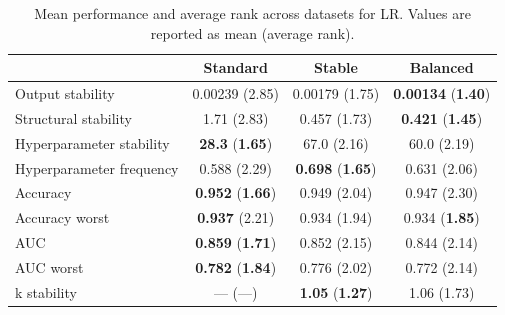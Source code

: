 \begin{table}
\caption{Mean performance and average rank across datasets for LR. Values are reported as mean (average rank).}
\label{tab:lr_mean_performance_rank}
\begin{tabular}{lccc}
\toprule
 & Standard & Stable & Balanced \\
\midrule
Output stability & 0.00239 (2.85) & 0.00179 (1.75) & \textbf{0.00134} (\textbf{1.40}) \\
Structural stability & 1.71 (2.83) & 0.457 (1.73) & \textbf{0.421} (\textbf{1.45}) \\
Hyperparameter stability & \textbf{28.3} (\textbf{1.65}) & 67.0 (2.16) & 60.0 (2.19) \\
Hyperparameter frequency & 0.588 (2.29) & \textbf{0.698} (\textbf{1.65}) & 0.631 (2.06) \\
Accuracy & \textbf{0.952} (\textbf{1.66}) & 0.949 (2.04) & 0.947 (2.30) \\
Accuracy worst & \textbf{0.937} (2.21) & 0.934 (1.94) & 0.934 (\textbf{1.85}) \\
AUC & \textbf{0.859} (\textbf{1.71}) & 0.852 (2.15) & 0.844 (2.14) \\
AUC worst & \textbf{0.782} (\textbf{1.84}) & 0.776 (2.02) & 0.772 (2.14) \\
k stability & — (—) & \textbf{1.05} (\textbf{1.27}) & 1.06 (1.73) \\
\bottomrule
\end{tabular}
\end{table}
